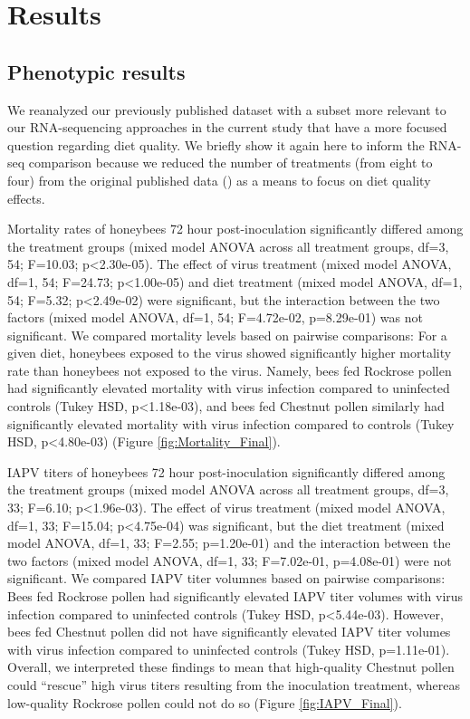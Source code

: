 \documentclass[11pt,a4paper,oldfontcommands,openany]{memoir}
\numberwithin{equation}{section} %
\begin{document}
\section{Results}

\subsection{Phenotypic results}

We reanalyzed our previously published dataset with a subset more relevant to our RNA-sequencing approaches in the current study that have a more focused question regarding diet quality. We briefly show it again here to inform the RNA-seq comparison because we reduced the number of treatments (from eight to four) from the original published data (\citealt{adamInt}) as a means to focus on diet quality effects.

Mortality rates of honeybees 72 hour post-inoculation significantly differed among the treatment groups (mixed model ANOVA across all treatment groups, df=3, 54; F=10.03; p<2.30e-05). The effect of virus treatment (mixed model ANOVA, df=1, 54; F=24.73; p<1.00e-05) and diet treatment (mixed model ANOVA, df=1, 54; F=5.32; p<2.49e-02) were significant, but the interaction between the two factors (mixed model ANOVA, df=1, 54; F=4.72e-02, p=8.29e-01) was not significant. We compared mortality levels based on pairwise comparisons: For a given diet, honeybees exposed to the virus showed significantly higher mortality rate than honeybees not exposed to the virus. Namely, bees fed Rockrose pollen had significantly elevated mortality with virus infection compared to uninfected controls (Tukey HSD, p<1.18e-03), and bees fed Chestnut pollen similarly had significantly elevated mortality with virus infection compared to controls (Tukey HSD, p<4.80e-03) (Figure \ref{fig:Mortality_Final}).

IAPV titers of honeybees 72 hour post-inoculation significantly differed among the treatment groups (mixed model ANOVA across all treatment groups, df=3, 33; F=6.10; p<1.96e-03). The effect of virus treatment (mixed model ANOVA, df=1, 33; F=15.04; p<4.75e-04) was significant, but the diet treatment (mixed model ANOVA, df=1, 33; F=2.55; p=1.20e-01) and the interaction between the two factors (mixed model ANOVA, df=1, 33; F=7.02e-01, p=4.08e-01) were not significant. We compared IAPV titer volumnes  based on pairwise comparisons: Bees fed Rockrose pollen had significantly elevated IAPV titer volumes with virus infection compared to uninfected controls (Tukey HSD, p<5.44e-03). However, bees fed Chestnut pollen did not have significantly elevated IAPV titer volumes with virus infection compared to uninfected controls (Tukey HSD, p=1.11e-01). Overall, we interpreted these findings to mean that high-quality Chestnut pollen could ``rescue'' high virus titers resulting from the inoculation treatment, whereas low-quality Rockrose pollen could not do so (Figure \ref{fig:IAPV_Final}).
\end{document}
